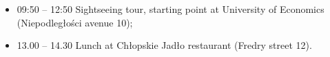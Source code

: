 \begin{enumerate}
        \begin{itemize}
                \item 09:50 – 12:50 Sightseeing tour, starting point at University of Economics (Niepodległości avenue 10);
                \item 13.00 – 14.30 Lunch at Chłopskie Jadło restaurant (Fredry street 12).
        \end{itemize}

\end{enumerate}
